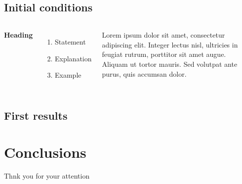\documentclass{beamer}
\begin{document}
\subsection{Initial conditions}
\begin{frame}
\begin{columns}[c] %

\textbf{Heading}
\begin{enumerate}
\item Statement
\item Explanation
\item Example
\end{enumerate}

Lorem ipsum dolor sit amet, consectetur adipiscing elit. Integer lectus nisl, ultricies in feugiat rutrum, porttitor sit amet augue. Aliquam ut tortor mauris. Sed volutpat ante purus, quis accumsan dolor.

\end{columns}
\end{frame}

\subsection{First results}
\begin{frame}
\end{frame}

\section{Conclusions}
\begin{frame}
	
\end{frame}


\begin{frame}
\Huge{\centerline{Thnk you for your attention}}
\end{frame}

\end{document}
